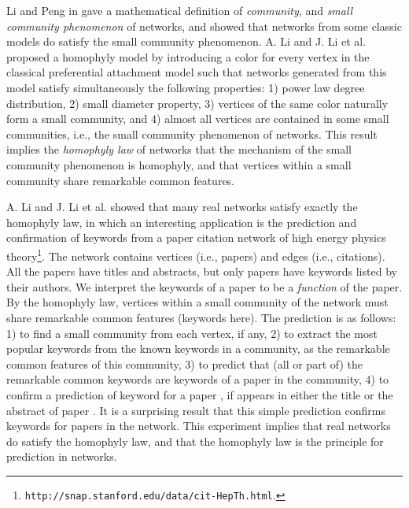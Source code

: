 \documentclass[11pt]{article}
\begin{document}
Li and Peng in \cite{LP11,LP12} gave a mathematical definition of
{\it community}, and {\it small community phenomenon} of networks,
and showed that networks from some classic models do satisfy the
small community phenomenon. A. Li and J. Li et al. \cite{LLPP11} proposed
a homophyly model by introducing a color for every vertex in the classical
preferential attachment
model such that networks generated from this model satisfy
simultaneously the following properties: 1) power law degree
distribution, 2) small diameter property, 3) vertices of the same color
naturally form a small community, and 4) almost all vertices are
contained in some small communities, i.e., the small community
phenomenon of networks. This result implies the {\it homophyly law}
of networks that the mechanism of the small community phenomenon is
homophyly, and that vertices within a small community share
remarkable common features.

A. Li and J. Li et al. \cite{LLPP12} showed that many real networks
satisfy exactly the homophyly law, in which an interesting application is
the prediction and confirmation of keywords from a paper citation network
of high energy physics
theory\footnote{\texttt{http://snap.stanford.edu/data/cit-HepTh.html}.}.
The network contains  vertices (i.e., papers) and  edges
(i.e., citations). All the papers have titles and abstracts, but only 
papers have keywords listed by their authors.
We interpret the keywords of a paper to be a {\it function} of the paper.
By the homophyly law, vertices within a small community of the network must
share remarkable common features (keywords here).
The prediction is as follows: 1) to find a
small community from each vertex, if any, 2) to extract
the most popular  keywords from the known keywords in a community,
as the remarkable common features of this community,
3) to predict that (all or part of) the  remarkable common
keywords are keywords of a paper in the community, 4) to confirm a
prediction of keyword  for a paper , if  appears in either
the title or the abstract of paper . It is a surprising result
that this simple prediction confirms keywords for  papers in
the network. This experiment implies that real networks do satisfy
the homophyly law, and that the homophyly law is the principle for
prediction in networks.
\end{document}
